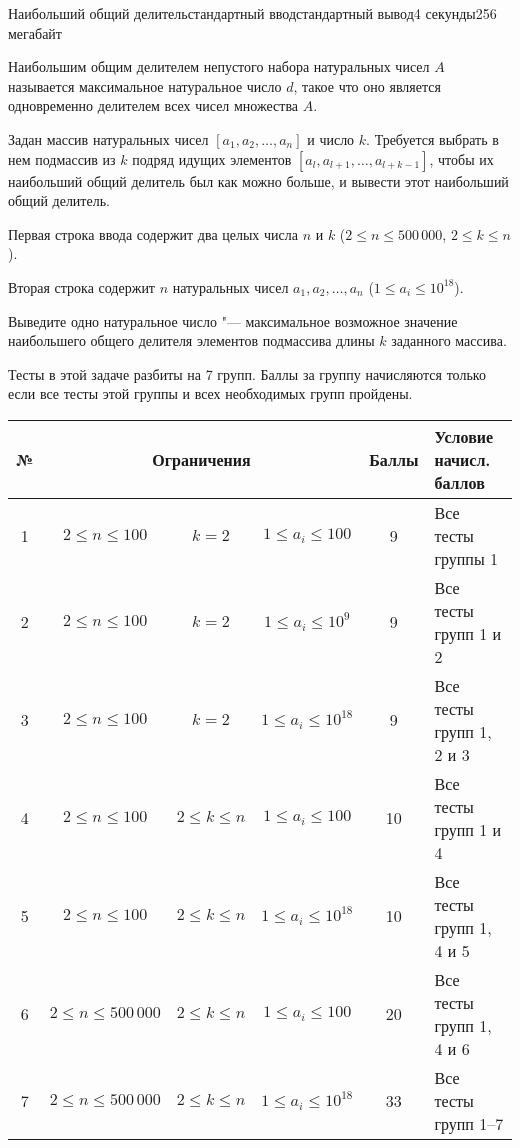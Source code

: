 \begin{problem}{Наибольший общий делитель}{стандартный ввод}{стандартный вывод}{4 секунды}{256 мегабайт}

Наибольшим общим делителем непустого набора натуральных чисел $A$ называется максимальное натуральное число $d$, такое что оно является одновременно делителем всех чисел множества $A$.

Задан массив натуральных чисел $[a_1, a_2, \ldots, a_n]$ и число $k$. Требуется выбрать в нем подмассив из $k$ подряд идущих элементов $[a_l, a_{l+1}, \ldots, a_{l+k-1}]$, чтобы их наибольший общий делитель был как можно больше, и вывести этот наибольший общий делитель.

\InputFile
Первая строка ввода содержит два целых числа $n$ и $k$ ($2 \le n \le 500\,000$, $2 \le k \le n$).

Вторая строка содержит $n$ натуральных чисел $a_1, a_2, \ldots, a_n$ ($1 \le a_i \le 10^{18}$).

\OutputFile
Выведите одно натуральное число "--- максимальное возможное значение наибольшего общего делителя элементов подмассива длины $k$ заданного массива.

\Scoring
Тесты в этой задаче разбиты на 7 групп. Баллы за группу начисляются только если
все тесты этой группы и всех необходимых групп пройдены.

\medskip

\begin{tabular}{|c|ccc|c|l|}
\hline
№ & \multicolumn{3}{c|}{Ограничения}& Баллы & Условие начисл. баллов\\
\hline
1 & $2 \le n \le 100$& $k=2$ &$1\le a_i\le 100$& 9 & Все тесты группы 1\\
\hline
2 & $2 \le n \le 100$& $k = 2$&$1\le a_i\le 10^9$& 9& Все тесты групп 1 и 2\\
\hline
3 & $2 \le n \le 100$& $k = 2$&$1\le a_i\le 10^{18}$& 9& Все тесты групп 1, 2 и 3\\
\hline
4 & $2 \le n \le 100$ & $2\le k \le n$&$1 \le a_i \le 100$& 10 & Все тесты групп 1 и 4\\
\hline
5 & $2 \le n \le 100$ & $2\le k \le n$&$1 \le a_i \le 10^{18}$& 10 & Все тесты групп 1, 4 и 5\\
\hline
6 & $2 \le n \le 500\,000$ & $2 \le k \le n$&$1 \le a_i \le 100$& 20 & Все тесты групп 1, 4 и 6\\
\hline
7 & $2 \le n \le 500\,000$ & $2 \le k \le n$&$1 \le a_i \le 10^{18}$& 33 & Все тесты групп 1--7\\
\hline
\end{tabular}

\Example

\begin{example}
%
\end{example}

\end{problem}

